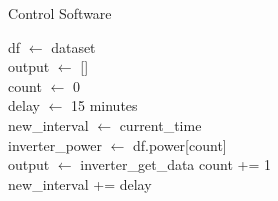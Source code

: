 \documentclass[final, 20 pt]{beamer}
\newlength{\onecolwid}
\newlength{\twocolwid}
\begin{document}
\begin{frame}[t]
\begin{columns}[t]
\begin{column}{\twocolwid}
\begin{columns}[t,totalwidth=\twocolwid]
\begin{column}{\onecolwid}

\end{column} %

\begin{column}{\onecolwid}\vspace{-.6in} %


\begin{block}{Control Software}

\begin{algorithm}[H]
	\caption{Microgrid Control Software}\label{alg:control_software}
	df $\gets$ dataset \\
	output $\gets$ [] \\
	count $\gets$ 0 \\
	delay $\gets$ 15 minutes \\
	new\_interval $\gets$ current\_time \\
	{
		inverter\_power $\gets$ df.power[count]\\
		{
			output $\gets$ inverter\_get\_data
		}
		count += 1 \\
		new\_interval += delay \\
	}	
\end{algorithm}

\end{block}


\end{column} %

\end{columns} %


%
%


\end{column}
\end{columns}
\end{frame}
\end{document}

